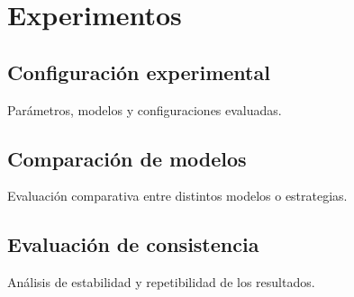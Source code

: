 \chapter{Experimentos}

\section{Configuración experimental}
Parámetros, modelos y configuraciones evaluadas.

\section{Comparación de modelos}
Evaluación comparativa entre distintos modelos o estrategias.

\section{Evaluación de consistencia}
Análisis de estabilidad y repetibilidad de los resultados.